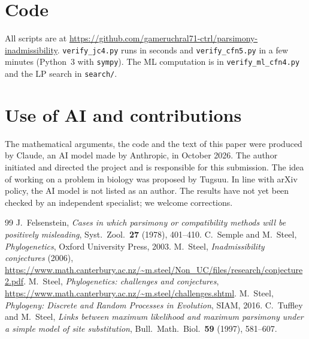 \documentclass[11pt]{amsart}
\theoremstyle{definition}
\theoremstyle{remark}
\begin{document}
\section*{Code}
All scripts are at \url{https://github.com/gameruchral71-ctrl/parsimony-inadmissibility}. \texttt{verify\_jc4.py} runs in seconds and \texttt{verify\_cfn5.py} in a few minutes (Python~3 with \texttt{sympy}). The ML computation is in \texttt{verify\_ml\_cfn4.py} and the LP search in \texttt{search/}.

\section*{Use of AI and contributions}
The mathematical arguments, the code and the text of this paper were produced by Claude, an AI model made by Anthropic, in October 2026. The author initiated and directed the project and is responsible for this submission. The idea of working on a problem in biology was proposed by Tugsuu. In line with arXiv policy, the AI model is not listed as an author. The results have not yet been checked by an independent specialist; we welcome corrections.

\begin{thebibliography}{99}
 J.~Felsenstein, \emph{Cases in which parsimony or compatibility methods will be positively misleading}, Syst.\ Zool.\ \textbf{27} (1978), 401--410.
 C.~Semple and M.~Steel, \emph{Phylogenetics}, Oxford University Press, 2003.
 M.~Steel, \emph{Inadmissibility conjectures} (2006), \url{https://www.math.canterbury.ac.nz/~m.steel/Non_UC/files/research/conjecture2.pdf}.
 M.~Steel, \emph{Phylogenetics: challenges and conjectures}, \url{https://www.math.canterbury.ac.nz/~m.steel/challenges.shtml}.
 M.~Steel, \emph{Phylogeny: Discrete and Random Processes in Evolution}, SIAM, 2016.
 C.~Tuffley and M.~Steel, \emph{Links between maximum likelihood and maximum parsimony under a simple model of site substitution}, Bull.\ Math.\ Biol.\ \textbf{59} (1997), 581--607.
\end{thebibliography}
\end{document}

